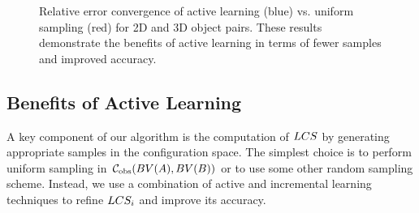 \begin{figure}[t]
\begin{center}
\end{center}
\caption[Relative error convergence of active learning vs. uniform sampling for 2D and 3D object pairs]{Relative error convergence of active learning (blue) vs. uniform sampling (red) for 2D and 3D object pairs. These results demonstrate the benefits of active learning in terms of fewer samples and improved accuracy.}
\label{fig:2:activelearningtime}
\end{figure}

\subsection{Benefits of Active Learning}
A key component of our algorithm is the computation of $LCS$ by generating appropriate samples in the configuration space. The simplest choice is to perform uniform sampling in $\mathcal C_{\text{obs}} (BV(A),BV(B))$ or  to use some other random sampling scheme. Instead, we use a combination of active and incremental learning techniques to refine $LCS_i$ and improve its accuracy.


